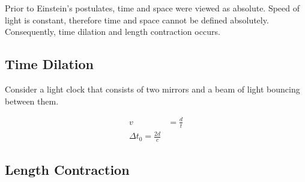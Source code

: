 		Prior to Einstein's postulates, time and space were viewed as absolute. Speed of light is constant, therefore time and space cannot be defined absolutely. Consequently, time dilation and length contraction occurs.

	\subsection{Time Dilation}
	
		Consider a light clock that consists of two mirrors and a beam of light bouncing between them.

		\begin{align*}
			v &= \frac{d}{t} \\
			\Delta t_0 = \frac{2d}{c}
		\end{align*}

	\subsection{Length Contraction}
	
		


